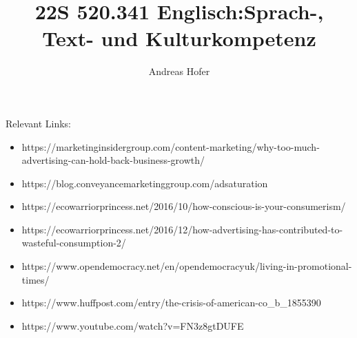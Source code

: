 \documentclass{article}
\title{22S 520.341 Englisch:Sprach-, Text- und Kulturkompetenz}
\author{Andreas Hofer}
\begin{document}
	Relevant Links:
	\begin{itemize}
		\item{https://marketinginsidergroup.com/content-marketing/why-too-much-advertising-can-hold-back-business-growth/}
		\item{https://blog.conveyancemarketinggroup.com/adsaturation}
		\item{https://ecowarriorprincess.net/2016/10/how-conscious-is-your-consumerism/}
		\item{https://ecowarriorprincess.net/2016/12/how-advertising-has-contributed-to-wasteful-consumption-2/}
		\item{https://www.opendemocracy.net/en/opendemocracyuk/living-in-promotional-times/}
		\item{https://www.huffpost.com/entry/the-crisis-of-american-co_b_1855390}
		\item{https://www.youtube.com/watch?v=FN3z8gtDUFE}
	\end{itemize}
	
\end{document}
